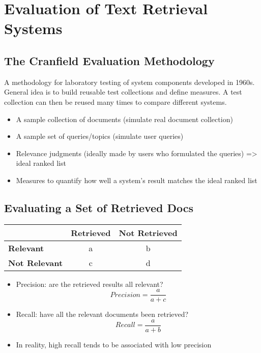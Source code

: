 \newpage
\section{Evaluation of Text Retrieval Systems}

\subsection{The Cranfield Evaluation Methodology}

A methodology for laboratory testing of system components developed in 1960s. General idea is to build reusable test collections and define measures. A test collection can then be reused many times to compare different systems.
\begin{itemize}
\item A sample collection of documents (simulate real document collection)
\item A sample set of queries/topics (simulate user queries)
\item Relevance judgments (ideally made by users who formulated the queries) => ideal ranked list
\item  Measures to quantify how well a system’s result matches the ideal ranked list
\end{itemize}


\subsection{Evaluating a Set of Retrieved Docs}

\begin{center}
  \begin{tabular}{ | l | c | c | }
    \hline
    & \textbf{Retrieved} & \textbf{Not Retrieved} \\    
    \hline    
    \textbf{Relevant}     & a & b \\
    \textbf{Not Relevant} & c & d \\
    \hline  
  \end{tabular}
\end{center}

\begin{itemize}
\item Precision: are the retrieved results all relevant?
\begin{equation*}
Precision = \frac{a}{a+c}
\end{equation*}
\item Recall: have all the relevant documents been retrieved?
\begin{equation*}
Recall = \frac{a}{a+b}
\end{equation*}
\item In reality, high recall tends to be associated with low precision
\end{itemize}



